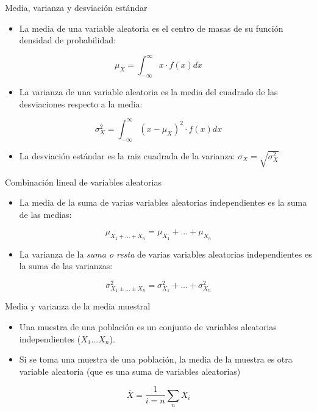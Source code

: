 \documentclass[aspectratio=169, usenames,svgnames,dvipsnames]{beamer}
\begin{document}
\begin{frame}[label={sec:org3db997c}]{Media, varianza y desviación estándar}
\begin{itemize}
\item La \alert{media} de una variable aleatoria es el \alert{centro de masas} de su función densidad de probabilidad:
\end{itemize}

\[
\mu_{X}=\int_{-\infty}^{\infty}x\cdot f(x)dx
\]

\begin{itemize}
\item La \alert{varianza} de una variable aleatoria es la \alert{media del cuadrado de las desviaciones} respecto a la media:
\end{itemize}

\[
\sigma_{X}^{2}=\int_{-\infty}^{\infty}(x-\mu_{X})^{2}\cdot f(x)dx
\]

\begin{itemize}
\item La \alert{desviación estándar} es la raiz cuadrada de la varianza: \(\sigma_{X}=\sqrt{\sigma_{X}^2}\)
\end{itemize}
\end{frame}



\begin{frame}[label={sec:orgd58f5c4}]{Combinación lineal de variables aleatorias}
\begin{itemize}
\item La \alert{media de la suma} de varias variables aleatorias \alert{independientes} es
la suma de las medias:
\end{itemize}
\[
\mu_{X_{1}+...+X_{n}}=\mu_{X_{1}}+...+\mu_{X_{n}}
\]

\begin{itemize}
\item La \alert{varianza de la \emph{suma o resta}} de varias variables aleatorias
\alert{independientes} es la \alert{suma} de las varianzas:
\end{itemize}

\[
\sigma_{X_{1}\pm...\pm X_{n}}^{2}=\sigma_{X_{1}}^{2}+...+\sigma_{X_{n}}^{2}
\]
\end{frame}



\begin{frame}[label={sec:org666317b}]{Media y varianza de la media muestral}
\begin{itemize}
\item Una \alert{muestra de una población} es un conjunto de variables
aleatorias independientes (\(X_{1}...X_{n}\)).

\item Si se toma una muestra de una población, la media de la muestra es otra
variable aleatoria (que es una suma de variables aleatorias)
\end{itemize}

\[
\overline{X}=\frac{1}{i=n}\sum_{n}X_{i}
\]
\end{frame}
\end{document}
